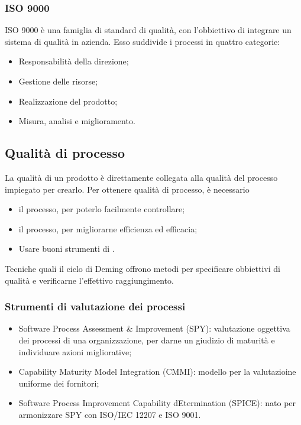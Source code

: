 \subsubsection{ISO 9000}
\label{ssub:iso_9000}

ISO 9000 è una famiglia di standard di qualità, con l'obbiettivo di integrare un
sistema di qualità in azienda. Esso suddivide i processi in quattro categorie:

\begin{itemize}
  \item Responsabilità della direzione;
  \item Gestione delle risorse;
  \item Realizzazione del prodotto;
  \item Misura, analisi e miglioramento.
\end{itemize}

\subsection{Qualità di processo}
\label{sub:qualita_di_processo}

La qualità di un prodotto è direttamente collegata alla qualità del processo
impiegato per crearlo. Per ottenere qualità di processo, è necessario

\begin{itemize}
  \item {} il processo, per poterlo facilmente controllare;
  \item {} il processo, per migliorarne efficienza ed
    efficacia;
  \item Usare buoni strumenti di .
\end{itemize}

Tecniche quali il ciclo di Deming offrono metodi per specificare obbiettivi di
qualità e verificarne l'effettivo raggiungimento.

\subsubsection{Strumenti di valutazione dei processi}
\label{ssub:strumenti_di_valutazione}

\begin{itemize}
  \item Software Process Assessment \& Improvement (SPY): valutazione oggettiva
    dei processi di una organizzazione, per darne un giudizio di maturità e
    individuare azioni migliorative;
  \item Capability Maturity Model Integration (CMMI): modello per la
    valutazioine uniforme dei fornitori;
  \item Software Process Improvement Capability dEtermination (SPICE): nato per
    armonizzare SPY con ISO/IEC 12207 e ISO 9001.
\end{itemize}

